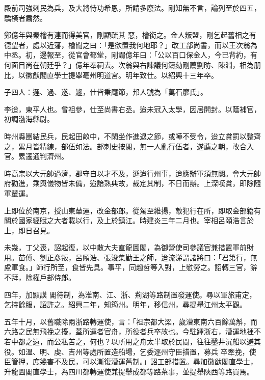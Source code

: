 \begin{pinyinscope}
 殿前司強刺民為兵，及大將恃功希恩，所請多廢法。剛知無不言，論列至於四五，驕橫者肅然。



 鄭億年與秦檜有連而得美官，剛顯疏其
 惡，檜銜之。金人叛盟，剛乞起舊相之有德望者，處以近藩，檜聞之曰：「是欲置我何地耶？」改工部尚書，而以王次翁為中丞。初，邊報至，從官會都堂，剛謂億年曰：「公以百口保金人，今已背約，有何面目尚在朝廷乎？」億年奉祠去。次翁與右諫議何鑄劾剛薦劉昉、陳淵，相為朋比，以徽猷閣直學士提舉亳州明道宮。明年致仕。以紹興十三年卒。



 子四人：遲、過、遂、遽，仕皆秉麾節，邦人號為「萬石廖氏」。



 李迨，東平人也。曾祖參，仕至尚書右丞。迨未冠入太學，因居開封。以蔭補官，初調渤海縣尉。



 時州縣團結民兵，民起田畝中，不閑坐作進退之節，或嘩不受令，迨立賞罰以整齊之，累月皆精練，部伍如法。部刺史按閱，無一人亂行伍者，遂薦之朝，改合入官。累遷通判濟州。



 時高宗以大元帥過濟，郡守自以才不及，遜迨行州事，迨應辦軍須無闕。會大元帥府勸進，乘輿儀物皆未備，迨諳熟典故，裁定其制，不日而辦。上深嘆賞，即除隨軍輦運。



 上即位於南京，授山東輦運，改金部郎。從駕至維揚，敵犯行在所，即取金部籍有關於國家經賦之大者載以行，及上於鎮江。時建炎三年二月也。宰相呂頤浩言於上，即日召見。



 未幾，丁父喪，詔起復，以中散大夫直龍圖閣，為御營使司參議官兼措置軍前財用。苗傅、劉正彥叛，呂頤浩、張浚集勤王之師，迨流涕謂諸將曰：「君第行，無慮軍食。」師行所至，食皆先具。事平，同趙哲等入對，上慰勞之。詔轉三官，辭不拜，除權戶部侍郎。



 四年，加顯謨
 閣待制，為淮南、江、浙、荊湖等路制置發運使。尋以軍旅甫定，乞持餘服，詔許之。紹興二年，知筠州。明年，移信州，尋提舉江州太平觀。



 五年十月，以舊職除兩浙路轉運使，言：「祖宗都大梁，歲漕東南六百餘萬斛，而六路之民無飛挽之擾，蓋所運者官舟，所役者兵卒故也。今駐蹕浙右，漕運地裡不若中都之遠，而公私苦之，何也？以所用之舟太半取於民間，往往鑿井沉船以避其役。如溫、明、虔、吉州等處所置造船場，乞委逐州守臣措置，募兵
 卒牽挽，使臣管押，庶幾害不及民，可以漸復漕運舊制。」詔工部措置。尋加徽猷閣直學士，升龍圖閣直學士，為四川都轉運使兼提舉成都等路茶事，並提舉陜西等路買馬。




\end{pinyinscope}
